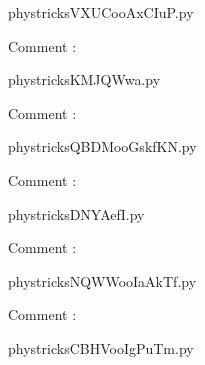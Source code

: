     \newcommand{\CaptionFigVXUCooAxCIuP}{<+Type your caption here+>}
    \begin{center}
        
    \end{center}
    phystricksVXUCooAxCIuP.py

    Comment : 

    \clearpage
    


    \newcommand{\CaptionFigKMJQWwa}{<+Type your caption here+>}
    \begin{center}
        
    \end{center}
    phystricksKMJQWwa.py

    Comment : 

    \clearpage
    


    \newcommand{\CaptionFigQBDMooGskfKN}{<+Type your caption here+>}
    \begin{center}
        
    \end{center}
    phystricksQBDMooGskfKN.py

    Comment : 

    \clearpage
    


    \newcommand{\CaptionFigDNYAefI}{<+Type your caption here+>}
    \begin{center}
        
    \end{center}
    phystricksDNYAefI.py

    Comment : 

    \clearpage
    


    \newcommand{\CaptionFigNQWWooIaAkTf}{<+Type your caption here+>}
    \begin{center}
        
    \end{center}
    phystricksNQWWooIaAkTf.py

    Comment : 

    \clearpage
    


    \newcommand{\CaptionFigCBHVooIgPuTm}{<+Type your caption here+>}
    \begin{center}
        
    \end{center}
    phystricksCBHVooIgPuTm.py

